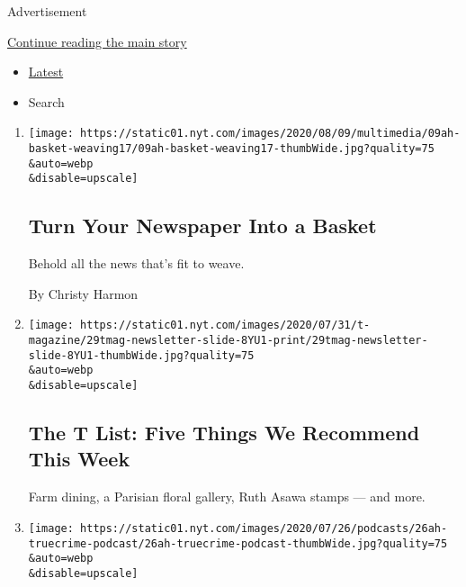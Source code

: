 Advertisement

\protect\hyperlink{after-mid1}{Continue reading the main story}

\begin{itemize}
\tightlist
\item
  \protect\hyperlink{stream-panel}{Latest}
\item
  Search
\end{itemize}

\begin{enumerate}
\def\labelenumi{\arabic{enumi}.}
\item
  \href{/2020/08/08/at-home/coronavirus-newspaper-basket.html}{}

  \texttt{[image: https://static01.nyt.com/images/2020/08/09/multimedia/09ah-basket-weaving17/09ah-basket-weaving17-thumbWide.jpg?quality=75\\\&auto=webp\\\&disable=upscale]}

  \hypertarget{turn-your-newspaper-into-a-basket}{%
  \subsection{Turn Your Newspaper Into a
  Basket}\label{turn-your-newspaper-into-a-basket}}

  Behold all the news that's fit to weave.

  By Christy Harmon
\item
  \href{/2020/07/30/t-magazine/the-t-list-five-things-we-recommend-this-week.html}{}

  \texttt{[image: https://static01.nyt.com/images/2020/07/31/t-magazine/29tmag-newsletter-slide-8YU1-print/29tmag-newsletter-slide-8YU1-thumbWide.jpg?quality=75\\\&auto=webp\\\&disable=upscale]}

  \hypertarget{the-t-list-five-things-we-recommend-this-week}{%
  \subsection{The T List: Five Things We Recommend This
  Week}\label{the-t-list-five-things-we-recommend-this-week}}

  Farm dining, a Parisian floral gallery, Ruth Asawa stamps --- and
  more.
\item
  \href{/2020/07/25/at-home/coronavirus-true-crime-podcasts-race.html}{}

  \texttt{[image: https://static01.nyt.com/images/2020/07/26/podcasts/26ah-truecrime-podcast/26ah-truecrime-podcast-thumbWide.jpg?quality=75\\\&auto=webp\\\&disable=upscale]}


\end{enumerate}
